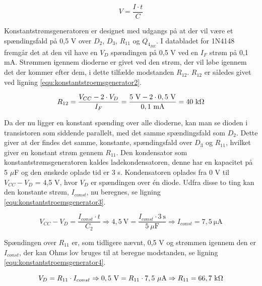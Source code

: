 \begin{equation}
\label{equ:konstantstroemsgenerator1}
V = \frac{I \cdot t}{C}
\end{equation}

Konstantstrømsgeneratoren er designet med udgangs på at der vil være et spændingsfald på 0,5 V over $D_2$, $D_3$, $R_{11}$ og $Q_{4_{BE}}$. I databladet for 1N4148 fremgår det at den vil have en $V_D$ spændingen på 0,5 V ved en $I_F$ strøm på 0,1 mA. Strømmen igennem dioderne er givet ved den strøm, der vil løbe igennem det der kommer efter dem, i dette tilfælde modstanden $R_{12}$. $R_{12}$ er således givet ved ligning \ref{equ:konstantstroemsgenerator2}.

\begin{equation}
\label{equ:konstantstroemsgenerator2}
R_{12} = \frac{V_{CC} - 2 \cdot V_D}{I_F} = \mathrm{\frac{5~V - 2 \cdot 0,5~V}{0,1~mA} = 40~k\ohm}
\end{equation}

Da der nu ligger en konstant spænding over alle dioderne, kan man se dioden i transistoren som siddende parallelt, med det samme spændingsfald som $D_2$. Dette giver at der findes det samme, konstante, spændingsfald over $D_3$ og $R_{11}$, hvilket giver en konstant strøm gennem $R_{11}$.
Den kondensator som konstantstrømsgeneratoren kaldes ladekondensatoren, denne har en kapacitet på 5 $\mu$F og den ønskede oplade tid er 3 s. Kondensatoren oplades fra 0 V til $V_{CC} - V_D$ = 4,5 V, hvor $V_D$ er spændingen over én diode. Udfra disse to ting kan den konstante strøm, $I_{const}$, nu beregnes, se ligning \ref{equ:konstantstroemsgenerator3}.

\begin{equation}
\label{equ:konstantstroemsgenerator3}
V_{CC} - V_D = \frac{I_{const} \cdot t}{C_2} \Rightarrow \mathrm{4,5~V} = \frac{I_{const} \cdot 3~\mathrm{s}}{5~\mu \mathrm{F}} \Rightarrow I_{const} = \mathrm{7,5~\mu A}
\end{equation}

Spændingen over $R_{11}$ er, som tidligere nævnt, 0,5 V og strømmen igennem den er $I_{const}$, der kan Ohms lov bruges til at beregne modstanden, se ligning \ref{equ:konstantstroemsgenerator4}.

\begin{equation}
\label{equ:konstantstroemsgenerator4}
V_D = R_{11} \cdot I_{const} \Rightarrow \mathrm{0,5~V} = R_{11} \cdot \mathrm{7,5~\mu A} \Rightarrow R_{11} = \mathrm{66,7~k\ohm}
\end{equation}

